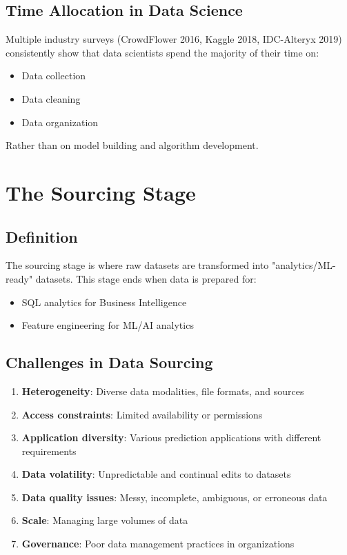 \documentclass[12pt]{article}
\begin{document}
\subsection{Time Allocation in Data Science}
\begin{tcolorbox}[colback=gray!10!white,colframe=gray!50!black,title=Research Findings]
Multiple industry surveys (CrowdFlower 2016, Kaggle 2018, IDC-Alteryx 2019) consistently show that data scientists spend the majority of their time on:
\begin{itemize}
    \item Data collection
    \item Data cleaning
    \item Data organization
\end{itemize}
Rather than on model building and algorithm development.
\end{tcolorbox}

\section{The Sourcing Stage}

\subsection{Definition}
The sourcing stage is where raw datasets are transformed into "analytics/ML-ready" datasets. This stage ends when data is prepared for:
\begin{itemize}
    \item SQL analytics for Business Intelligence
    \item Feature engineering for ML/AI analytics
\end{itemize}

\subsection{Challenges in Data Sourcing}
\begin{enumerate}
    \item \textbf{Heterogeneity}: Diverse data modalities, file formats, and sources
    \item \textbf{Access constraints}: Limited availability or permissions
    \item \textbf{Application diversity}: Various prediction applications with different requirements
    \item \textbf{Data volatility}: Unpredictable and continual edits to datasets
    \item \textbf{Data quality issues}: Messy, incomplete, ambiguous, or erroneous data
    \item \textbf{Scale}: Managing large volumes of data
    \item \textbf{Governance}: Poor data management practices in organizations
\end{enumerate}
\end{document}
